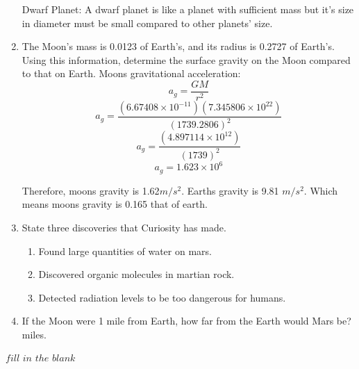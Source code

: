 \documentclass[12pt]{article}
\begin{document}
\begin{enumerate}
        Dwarf Planet: A dwarf planet is like a planet with sufficient mass but it's size in diameter must be small compared to other planets' size.
    \item The Moon’s mass is 0.0123 of Earth’s, and its radius is 0.2727 of Earth’s. Using this information, determine the surface gravity on the Moon compared to that on Earth.\newline\newline
        Moons gravitational acceleration:
        \begin{equation}
          a_{g} = \frac{GM}{r^{2}}
        \end{equation}
        \begin{equation}
          a_{g} = \frac{(6.67408\times 10^{-11}) (7.345806\times10^{22})}{(1739.2806)^{2}}
        \end{equation}
        \begin{equation}
          a_{g} = \frac{(4.897114\times10^{12})}{(1739)^{2}}
        \end{equation}
        \begin{equation}
          a_{g} = 1.623 \times 10^{6}
        \end{equation}

        Therefore, moons gravity is  1.62$ m/s^{2}$. Earths gravity is 9.81 $m/s^{2}$. Which means moons gravity is 0.165 that of earth.



    \item State three discoveries that Curiosity has made.
        \begin{enumerate}
          \item Found large quantities of water on mars.
          \item Discovered organic molecules in martian rock.
          \item Detected radiation levels to be too dangerous for humans.
        \end{enumerate}
    \item If the Moon were 1 mile from Earth, how far from the Earth would Mars be?\newline{} miles.
\end{enumerate}

$fill$ $in$ $the$ $blank$
\end{document}
